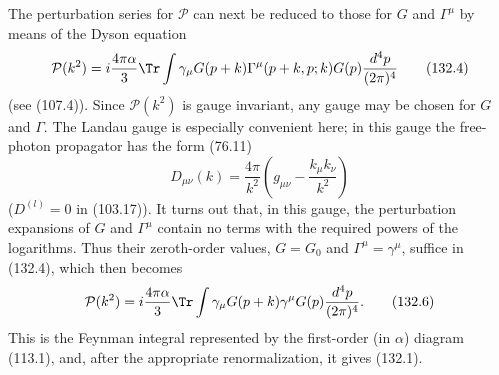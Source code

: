 The perturbation series for $\mathcal P$ can next be reduced to those for $G$ and $\Gamma^\mu$ by means of the Dyson equation
\begin{equation}
\mathcal P(k^2)=i\frac{4\pi\alpha}{3}\Tr\int\gamma_\mu G(p+k)\Gamma^\mu(p+k,p;k)G(p)\frac{d^4p}{(2\pi)^4}
\tag{132.4}
\end{equation}
(see (107.4)). Since $\mathcal P(k^2)$ is gauge invariant, any gauge may be chosen for $G$ and $\Gamma$. The Landau gauge is especially convenient here; in this gauge the free-photon propagator has the form (76.11)
\begin{equation}
D_{\mu\nu}(k)=\frac{4\pi}{k^2}\left(g_{\mu\nu}-\frac{k_\mu k_\nu}{k^2}\right)
\tag{132.5}
\end{equation}
($D^{(l)}=0$ in (103.17)). It turns out that, in this gauge, the perturbation expansions of $G$ and $\Gamma^\mu$ contain no terms with the required powers of the logarithms. Thus their zeroth-order values, $G=G_0$ and $\Gamma^\mu=\gamma^\mu$, suffice in (132.4), which then becomes
\begin{equation}
\mathcal P(k^2)=i\frac{4\pi\alpha}{3}\Tr\int\gamma_\mu G(p+k)\gamma^\mu G(p)\frac{d^4p}{(2\pi)^4}.
\tag{132.6}
\end{equation}
This is the Feynman integral represented by the first-order (in $\alpha$) diagram (113.1), and, after the appropriate renormalization, it gives (132.1).

